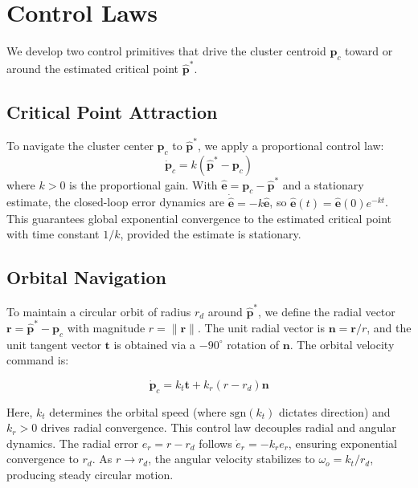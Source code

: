 \section{Control Laws}
\label{sec:ch6:control_laws}

We develop two control primitives that drive the cluster centroid $\mathbf{p}_c$ toward or around the estimated critical point $\hat{\mathbf{p}}^*$.

\subsection{Critical Point Attraction}
\label{sec:ch6:attraction_def}

To navigate the cluster center $\mathbf{p}_c$ to $\hat{\mathbf{p}}^*$, we apply a proportional control law:
\begin{equation}\label{eq:ch6:10}
\dot{\mathbf{p}}_c = k(\hat{\mathbf{p}}^* - \mathbf{p}_c)
\end{equation}
where $k > 0$ is the proportional gain. With $\hat{\mathbf{e}} = \mathbf{p}_c - \hat{\mathbf{p}}^*$ and a stationary estimate, the closed-loop error dynamics are $\dot{\hat{\mathbf{e}}} = -k\hat{\mathbf{e}}$, so $\hat{\mathbf{e}}(t) = \hat{\mathbf{e}}(0)e^{-kt}$. This guarantees global exponential convergence to the estimated critical point with time constant $1/k$, provided the estimate is stationary.

\subsection{Orbital Navigation}
\label{sec:ch6:orbital_def}

To maintain a circular orbit of radius $r_d$ around $\hat{\mathbf{p}}^*$, we define the radial vector $\mathbf{r} = \hat{\mathbf{p}}^* - \mathbf{p}_c$ with magnitude $r = \|\mathbf{r}\|$. The unit radial vector is $\mathbf{n} = \mathbf{r}/r$, and the unit tangent vector $\mathbf{t}$ is obtained via a $-90^\circ$ rotation of $\mathbf{n}$. The orbital velocity command is:

\begin{equation}\label{eq:ch6:11}
\dot{\mathbf{p}}_c = k_t \mathbf{t} + k_r(r - r_d)\mathbf{n}
\end{equation}

Here, $k_t$ determines the orbital speed (where $\text{sgn}(k_t)$ dictates direction) and $k_r > 0$ drives radial convergence.
This control law decouples radial and angular dynamics. The radial error $e_r = r - r_d$ follows $\dot{e}_r = -k_r e_r$, ensuring exponential convergence to $r_d$. As $r \to r_d$, the angular velocity stabilizes to $\omega_o = k_t/r_d$, producing steady circular motion.

